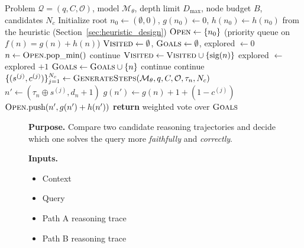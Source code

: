 \documentclass[11pt]{article}
\begin{document}
{\begin{algorithm}[t]
\caption{Budgeted A* Search over Reasoning Traces}
\label{alg:astar}
\begin{algorithmic}[1]
\REQUIRE Problem $\mathcal{Q}=(q,C,\mathcal{O})$, model $\mathcal{M}_\theta$, depth limit $D_{\max}$, node budget $B$, candidates $N_c$
\STATE Initialize root $n_0 \gets (\emptyset,0)$, $g(n_0) \gets 0$, $h(n_0) \gets h(n_0)$ from the heuristic (Section~\ref{sec:heuristic_design})
\STATE $\textsc{Open} \gets \{n_0\}$ (priority queue on $f(n)=g(n)+h(n)$)
\STATE $\textsc{Visited} \gets \emptyset$, $\textsc{Goals} \gets \emptyset$, explored $\gets 0$
    \STATE $n \gets \textsc{Open}.\text{pop\_min}()$
        \STATE continue
    \ENDIF
    \STATE $\textsc{Visited} \gets \textsc{Visited} \cup \{\text{sig}(n)\}$
    \STATE explored $\gets$ explored $+ 1$
        \STATE $\textsc{Goals} \gets \textsc{Goals} \cup \{n\}$
        \STATE continue
    \ENDIF
        \STATE continue
    \ENDIF
    \STATE $\{(s^{(j)}, c^{(j)})\}_{j=1}^{N_c} \gets \textsc{GenerateSteps}(\mathcal{M}_\theta, q, C, \mathcal{O}, \tau_n, N_c)$
        \STATE $n' \gets (\tau_n \oplus s^{(j)}, d_n+1)$
        \STATE $g(n') \gets g(n) + 1 + (1-c^{(j)})$
        \STATE $\textsc{Open}.\text{push}(n', g(n') + h(n'))$
    \ENDFOR
\ENDWHILE
\STATE \textbf{return} weighted vote over $\textsc{Goals}$
\end{algorithmic}
\end{algorithm}




\begin{figure}[t]
\centering
\small


\begin{minipage}[t]{0.485\textwidth}
\begin{tcolorbox}[promptcard,title=LLM-as-Judge]
\textbf{Purpose.} Compare two candidate reasoning trajectories and decide which one solves the query more \emph{faithfully} and \emph{correctly}. 

\vspace{2pt}
\textbf{Inputs.}
\begin{itemize}
    \setlength{\itemsep}{1pt}
    \item Context
    \item Query
    \item Path A reasoning trace
    \item Path B reasoning trace
\end{itemize}


\end{tcolorbox}
\end{minipage}
\end{figure}}
\end{document}
